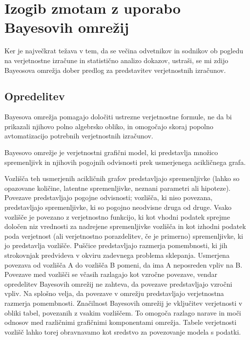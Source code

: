 \documentclass[fin1, tisk]{fmfdelo}
\theoremstyle{definition}
\theoremstyle{trditev}
\theoremstyle{izrek}
\begin{document}
\section{Izogib zmotam z uporabo Bayesovih omrežij}
Ker je največkrat težava v tem, da se večina odvetnikov in sodnikov ob pogledu na verjetnostne izračune in statistično analizo dokazov, ustraši, se mi 
zdijo Bayeosova omrežja dober predlog za predstavitev verjetnostnih izračunov.

\subsection{Opredelitev}
Bayesova omrežja pomagajo določiti ustrezne verjetnostne formule, ne da bi prikazali njihovo polno algebrsko obliko, in omogočajo
skoraj popolno avtomatizacijo potrebnih verjetnostnih izračunov.
\begin{definicija}
   Bayesovo omrežje je verjetnostni grafični model, ki predstavlja množico spremenljivk in njihovih pogojnih odvisnosti prek usmerjenega
   acikličnega grafa.
\end{definicija}
Vozlišča teh usmerjenih acikličnih grafov predstavljajo spremenljivke (lahko so opazovane količine, latentne spremenljivke, neznani parametri
ali hipoteze). Povezave predstavljajo pogojne odvisnosti; vozlišča, ki niso povezana, predstavljajo spremenljivke, ki so pogojno neodvisne
druga od druge. Vsako vozlišče je povezano z verjetnostno funkcijo, ki kot vhodni podatek sprejme določen niz vrednosti za nadrejene spremenljivke
vozlišča in kot izhodni podatek poda verjetnost (ali verjetnostno porazdelitev, če je primerno) spremenljivke, ki jo predstavlja vozlišče. Puščice
predstavljajo razmerja pomembnosti, ki jih strokovnjak predvideva v okviru zadevnega problema sklepanja. Usmerjena povezava od vozlišča A do
vozlišča B pomeni, da ima A neposreden vpliv na B. Povezave med vozlišči se včasih razlagajo kot vzročne povezave, vendar opredelitev Bayesovih
omrežij ne zahteva, da povezave predstavljajo vzročni vpliv. Na splošno velja, da povezave v omrežju predstavljajo verjetnostna razmerja
pomembnosti. Značilnost Bayesovih omrežij je vključitev verjetnosti v obliki tabel, povezanih z vsakim vozliščem. To omogoča razlago narave in
moči odnosov med različnimi grafičnimi komponentami omrežja. Tabele verjetnosti vozlišč lahko torej obravnavamo kot sredstvo za povezovanje
modela s podatki.
\end{document}
